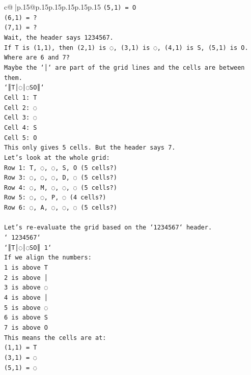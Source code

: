 \documentclass{article}
\begin{document}
{\begin{supertabular}{c@{$\;$}|p{.15\linewidth}@{}p{.15\linewidth}p{.15\linewidth}p{.15\linewidth}p{.15\linewidth}p{.15\linewidth}}
{{{\texttt{(5,1) = O} \\
\texttt{(6,1) = ?} \\
\texttt{(7,1) = ?} \\
\texttt{Wait, the header says 1234567.} \\
\texttt{If T is (1,1), then (2,1) is ◌, (3,1) is ◌, (4,1) is S, (5,1) is O.} \\
\texttt{Where are 6 and 7?} \\
\texttt{Maybe the `│` are part of the grid lines and the cells are between them.} \\
\texttt{`║T│◌│◌SO║`} \\
\texttt{Cell 1: T} \\
\texttt{Cell 2: ◌} \\
\texttt{Cell 3: ◌} \\
\texttt{Cell 4: S} \\
\texttt{Cell 5: O} \\
\texttt{This only gives 5 cells. But the header says 7.} \\
\texttt{Let's look at the whole grid:} \\
\texttt{Row 1: T, ◌, ◌, S, O (5 cells?)} \\
\texttt{Row 3: ◌, ◌, ◌, D, ◌ (5 cells?)} \\
\texttt{Row 4: ◌, M, ◌, ◌, ◌ (5 cells?)} \\
\texttt{Row 5: ◌, ◌, P, ◌ (4 cells?)} \\
\texttt{Row 6: ◌, A, ◌, ◌, ◌ (5 cells?)} \\
\\ 
\texttt{Let's re{-}evaluate the grid based on the `1234567` header.} \\
\texttt{` 1234567`} \\
\texttt{`║T│◌│◌SO║ 1`} \\
\texttt{If we align the numbers:} \\
\texttt{1 is above T} \\
\texttt{2 is above │} \\
\texttt{3 is above ◌} \\
\texttt{4 is above │} \\
\texttt{5 is above ◌} \\
\texttt{6 is above S} \\
\texttt{7 is above O} \\
\texttt{This means the cells are at:} \\
\texttt{(1,1) = T} \\
\texttt{(3,1) = ◌} \\
\texttt{(5,1) = ◌} \\
}}}
\end{supertabular}}
\end{document}
